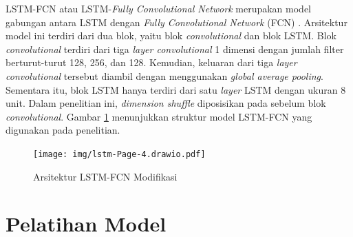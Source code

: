 LSTM-FCN atau LSTM-\textit{Fully Convolutional Network} merupakan model gabungan antara LSTM dengan  \textit{Fully Convolutional Network} (FCN) \parencite{karimLSTMFullyConvolutional2018}.
Arsitektur model ini terdiri dari dua blok, yaitu blok \textit{convolutional} dan blok LSTM.
Blok \textit{convolutional} terdiri dari tiga \textit{layer convolutional} 1 dimensi dengan jumlah filter berturut-turut 128, 256, dan 128.
Kemudian, keluaran dari tiga \textit{layer convolutional} tersebut diambil dengan menggunakan \textit{global average pooling}.
Sementara itu, blok LSTM hanya terdiri dari satu \textit{layer} LSTM dengan ukuran 8 unit.
Dalam penelitian ini, \textit{dimension shuffle} diposisikan pada sebelum blok \textit{convolutional}.
Gambar \ref{fig:arslstmfcn} menunjukkan struktur model LSTM-FCN yang digunakan pada penelitian.

\begin{figure}[H]
  \centering
  \texttt{[image: img/lstm-Page-4.drawio.pdf]}
  \caption{Arsitektur LSTM-FCN Modifikasi}
  \label{fig:arslstmfcn}
\end{figure}

\section{Pelatihan Model}
%

